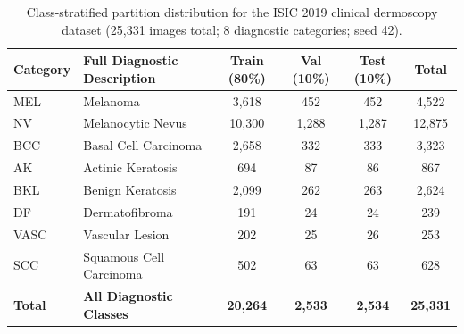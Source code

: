 \documentclass[10pt]{article}
\begin{document}
\begin{table}[!ht]
\caption{Class-stratified partition distribution for the ISIC 2019 clinical dermoscopy dataset (25,331 images total; 8 diagnostic categories; seed 42).}\label{tab:supp_isic_class_split}
\centering
\small
\begin{tabular}{ll cccc}
\toprule
\textbf{Category} & \textbf{Full Diagnostic Description} & \textbf{Train (80\%)} & \textbf{Val (10\%)} & \textbf{Test (10\%)} & \textbf{Total} \\
\midrule
MEL  & Melanoma & 3,618 & 452 & 452 & 4,522 \\
NV   & Melanocytic Nevus & 10,300 & 1,288 & 1,287 & 12,875 \\
BCC  & Basal Cell Carcinoma & 2,658 & 332 & 333 & 3,323 \\
AK   & Actinic Keratosis & 694 & 87 & 86 & 867 \\
BKL  & Benign Keratosis & 2,099 & 262 & 263 & 2,624 \\
DF   & Dermatofibroma & 191 & 24 & 24 & 239 \\
VASC & Vascular Lesion & 202 & 25 & 26 & 253 \\
SCC  & Squamous Cell Carcinoma & 502 & 63 & 63 & 628 \\
\midrule
\textbf{Total} & \textbf{All Diagnostic Classes} & \textbf{20,264} & \textbf{2,533} & \textbf{2,534} & \textbf{25,331} \\
\bottomrule
\end{tabular}
\end{table}
\end{document}
